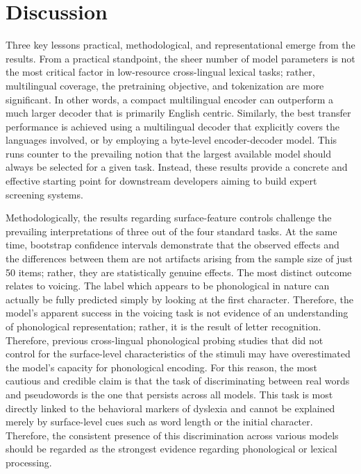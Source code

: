 \documentclass[preprint,12pt,authoryear]{elsarticle}
\begin{document}
\section{Discussion}
\label{sec:discussion}
Three key lessons practical, methodological, and representational emerge from the results. From a practical standpoint, the sheer number of model parameters is not the most critical factor in low-resource cross-lingual lexical tasks; rather, multilingual coverage, the pretraining objective, and tokenization are more significant. In other words, a compact multilingual encoder can outperform a much larger decoder that is primarily English centric. Similarly, the best transfer performance is achieved using a multilingual decoder that explicitly covers the languages involved, or by employing a byte-level encoder-decoder model. This runs counter to the prevailing notion that the largest available model should always be selected for a given task. Instead, these results provide a concrete and effective starting point for downstream developers aiming to build expert screening systems.

Methodologically, the results regarding surface-feature controls challenge the prevailing interpretations of three out of the four standard tasks. At the same time, bootstrap confidence intervals demonstrate that the observed effects and the differences between them are not artifacts arising from the sample size of just 50 items; rather, they are statistically genuine effects. The most distinct outcome relates to voicing. The label which appears to be phonological in nature can actually be fully predicted simply by looking at the first character. Therefore, the model's apparent success in the voicing task is not evidence of an understanding of phonological representation; rather, it is the result of letter recognition. Therefore, previous cross-lingual phonological probing studies that did not control for the surface-level characteristics of the stimuli may have overestimated the model's capacity for phonological encoding. For this reason, the most cautious and credible claim is that the task of discriminating between real words and pseudowords is the one that persists across all models. This task is most directly linked to the behavioral markers of dyslexia and cannot be explained merely by surface-level cues such as word length or the initial character. Therefore, the consistent presence of this discrimination across various models should be regarded as the strongest evidence regarding phonological or lexical processing.
\end{document}
